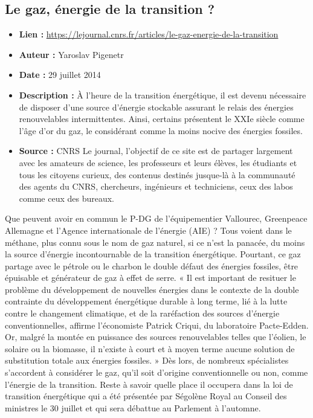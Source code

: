 \documentclass[8pt]{article}
\begin{document}
\subsection{Le gaz, énergie de la transition ?}

\begin{itemize}
	\item \textbf{Lien : }  \url{https://lejournal.cnrs.fr/articles/le-gaz-energie-de-la-transition} 
	\item \textbf{Auteur : } Yaroslav Pigenetr 
	\item \textbf{Date : } 29 juillet 2014
	\item \textbf{Description : } À l’heure de la transition énergétique, il est devenu nécessaire de disposer d’une source d’énergie stockable assurant le relais des énergies renouvelables intermittentes. Ainsi, certains présentent le XXIe siècle comme l’âge d’or du gaz, le considérant comme la moins nocive des énergies fossiles.
	\item \textbf{Source : } CNRS Le journal, l'objectif de ce site est de partager largement avec les amateurs de science, les professeurs et leurs élèves, les étudiants et tous les citoyens curieux, des contenus destinés jusque-là à la communauté des agents du CNRS, chercheurs, ingénieurs et techniciens, ceux des labos comme ceux des bureaux.
\end{itemize}

Que peuvent avoir en commun le P-DG de l’équipementier Vallourec, Greenpeace Allemagne et l’Agence internationale de l’énergie (AIE) ? Tous voient dans le méthane, plus connu sous le nom de gaz naturel, si ce n’est la panacée, du moins la source d’énergie incontournable de la transition énergétique. Pourtant, ce gaz partage avec le pétrole ou le charbon le double défaut des énergies fossiles, être épuisable et générateur de gaz à effet de serre. « Il est important de resituer le problème du développement de nouvelles énergies dans le contexte de la double contrainte du développement énergétique durable à long terme, lié à la lutte contre le changement climatique, et de la raréfaction des sources d’énergie conventionnelles, affirme l’économiste Patrick Criqui, du laboratoire Pacte-Edden. Or, malgré la montée en puissance des sources renouvelables telles que l’éolien, le solaire ou la biomasse, il n’existe à court et à moyen terme aucune solution de substitution totale aux énergies fossiles. » Dès lors, de nombreux spécialistes s’accordent à considérer le gaz, qu’il soit d’origine conventionnelle ou non, comme l’énergie de la transition. Reste à savoir quelle place il occupera dans la loi de transition énergétique qui a été présentée par Ségolène Royal au Conseil des ministres le 30 juillet et qui sera débattue au Parlement à l’automne. \\
\end{document}
